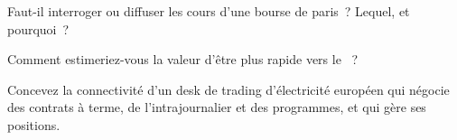 \begin{interviewq}\label{iq:nw:power-commodities-and-betting-connectivity:4}
Faut-il interroger ou diffuser les cours d'une bourse de paris~? Lequel, et pourquoi~?
\end{interviewq}

\begin{interviewq}\label{iq:nw:power-commodities-and-betting-connectivity:5}
Comment estimeriez-vous la valeur d'être plus rapide vers le ~?
\end{interviewq}

\begin{interviewq}\label{iq:nw:power-commodities-and-betting-connectivity:6}
Concevez la connectivité d'un desk de trading d'électricité européen qui négocie des contrats à terme, de l'intrajournalier et des programmes, et qui gère ses positions.
\end{interviewq}
